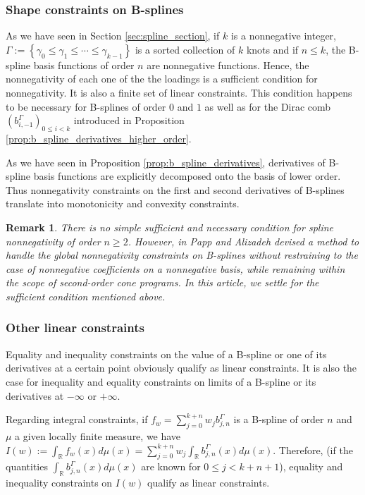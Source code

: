 \documentclass[a4paper]{article}
\newtheorem*{remark}{Remark}
\newcommand{\1}{\textbf{1}}
\newcommand{\R}{\mathbb{R}}
\begin{document}
\subsubsection*{Shape constraints on B-splines}
\par As we have seen in Section \ref{sec:spline_section}, if $k$ is a nonnegative integer, $\Gamma := \left\{ \gamma_0 \leq \gamma_1 \leq \cdots \leq \gamma_{k-1} \right\}$ is a sorted collection of $k$ knots and if $n \leq k$, the B-spline basis functions of order $n$ are nonnegative functions. Hence, the nonnegativity of each one of the the loadings is a sufficient condition for nonnegativity. It is also a finite set of linear constraints. This condition happens to be necessary for B-splines of order $0$ and $1$ as well as for the Dirac comb $\left(b^\Gamma_{i, -1}\right)_{0 \leq i < k}$ introduced in Proposition \ref{prop:b_spline_derivatives_higher_order}. 
\par As we have seen in Proposition \ref{prop:b_spline_derivatives}, derivatives of B-spline basis functions are explicitly decomposed onto the basis of lower order. Thus nonnegativity constraints on the first and second derivatives of B-splines translate into monotonicity and convexity constraints. 
\begin{remark}
There is no simple sufficient and necessary condition for spline nonnegativity of order $n \geq 2$. However, in \cite{PappAlizadeh} Papp and Alizadeh devised a method to handle the global nonnegativity constraints on B-splines without restraining to the case of nonnegative coefficients on a nonnegative basis, while remaining within the scope of second-order cone programs. In this article, we settle for the sufficient condition mentioned above.
\end{remark}
\subsubsection*{Other linear constraints}
\par Equality and inequality constraints on the value of a B-spline or one of its derivatives at a certain point obviously qualify as linear constraints. It is also the case for inequality and equality constraints on limits of a B-spline or its derivatives at $-\infty$ or $+\infty$. 
\par Regarding integral constraints, if $f_w = \sum\limits_{j = 0}^{k + n} w_j b^{\Gamma}_{j, n}$ is a B-spline of order $n$ and $\mu$ a given locally finite measure, we have $I(w) := \int_\R f_w(x) d\mu(x) = \sum\limits_{j = 0}^{k + n} w_j \int_\R b^{\Gamma}_{j, n}(x) d\mu(x)$. Therefore, (if the quantities $\int_\R b^{\Gamma}_{j, n}(x) d\mu(x)$ are known for $0 \leq j < k + n + 1$), equality and inequality constraints on $I(w)$ qualify as linear constraints.
\end{document}

